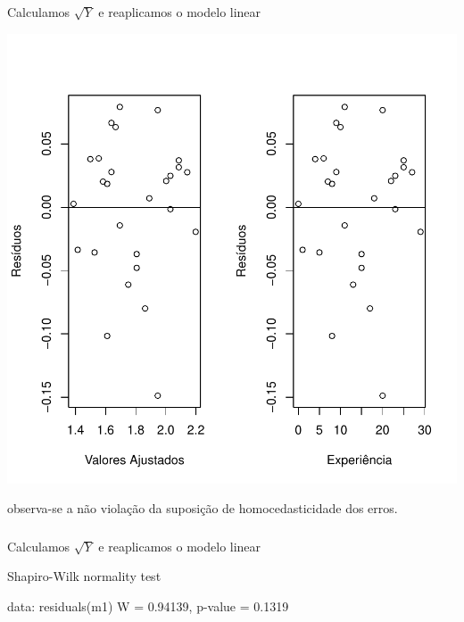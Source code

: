 \documentclass[14pt,aspectratio=1610]{beamer}
\begin{document}
\begin{frame}[fragile]{}
\frametitle{ }
\begin{block}{Calculamos $\sqrt{Y}$ e reaplicamos o modelo linear}
\vspace{-0.5cm}
\begin{center}
\includegraphics{Aula17-024}
\end{center}
\vspace{-0.5cm}
observa-se a não violação da suposição de homocedasticidade dos erros.
\end{block}
\end{frame}
% 
\begin{frame}[fragile]{}
\frametitle{ }
\begin{block}{Calculamos $\sqrt{Y}$ e reaplicamos o modelo linear}
\begin{center}
\begin{Schunk}
\begin{Soutput}
	Shapiro-Wilk normality test

data:  residuals(m1)
W = 0.94139, p-value = 0.1319
\end{Soutput}
\end{Schunk}
\end{center}
\end{block}
\end{frame}
\end{document}

